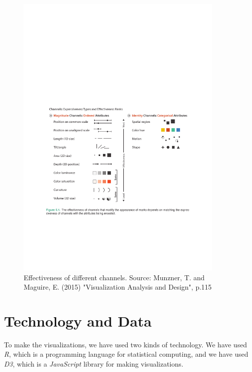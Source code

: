 \documentclass[portrait, a0,30pt]{sciposter}
\begin{document}
\begin{multicols}{2}
\begin{mdframed}[backgroundcolor=white]
	\begin{figure}[H]
		\center
		\includegraphics[width=0.9\textwidth,
		trim=80 323 75 327, clip]{fig/channels_marks_effectiveness}
		\caption{Effectiveness of different channels. 
		Source: Munzner, T. and Maguire, E. (2015) "Visualization Analysis and Design", p.115}
		\label{Fig:efficiency}
	\end{figure}
\end{mdframed}


\section*{Technology and Data}
\begin{mdframed}
To make the visualizations, we have used two kinds of technology. We have used \emph{R}, which is a programming language for statistical computing, and we have used \emph{D3}, which is a \emph{JavaScript} library for making visualizations. 


\end{mdframed}
\end{multicols}
\end{document}
